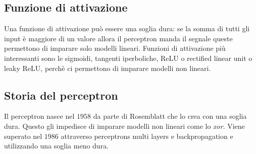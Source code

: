 	\subsection{Funzione di attivazione}
	Una funzione di attivazione pu\`o essere una soglia dura: se la somma di tutti gli input \`e maggiore di un valore allora il perceptron manda il segnale queste permettono di imparare solo modelli lineari.
	Funzioni di attivazione pi\`u interessanti sono le sigmoidi, tangenti iperboliche, ReLU o rectified linear unit o leaky ReLU, perch\`e ci permettono di imparare modelli non lineari.
	
	\subsection{Storia del perceptron}
	Il perceptron nasce nel $1958$ da parte di Rosemblatt che lo crea con una soglia dura.
	Questo gli impedisce di imparare modelli non lineari come lo \emph{xor}.
	Viene superato nel $1986$ attraverso perceptrons multi layers e backpropagation e utilizzando una soglia meno dura.
